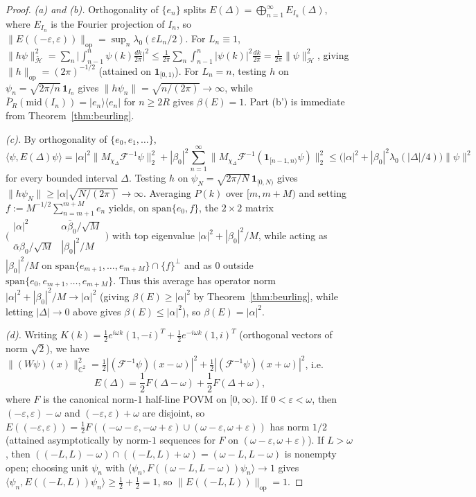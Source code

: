 \documentclass[11pt,a4paper]{article}
\theoremstyle{definition}
\theoremstyle{remark}
\newcommand{\HH}{\mathcal{H}}
\newcommand{\tH}{\widetilde{\mathcal{H}}}
\newcommand{\CC}{\mathbb{C}}
\newcommand{\op}{\mathrm{op}}
\newcommand{\one}{\mathbf{1}}
\newcommand{\ket}[1]{|#1\rangle}
\newcommand{\bra}[1]{\langle #1|}
\newcommand{\ip}[2]{\langle #1, #2 \rangle}
\newcommand{\norm}[1]{\|#1\|}
\begin{document}
\begin{proof}
\emph{(a) and (b).} Orthogonality of $\{e_n\}$ splits $E(\Delta)=\bigoplus_{n=1}^\infty E_{I_n}(\Delta)$, where $E_{I_n}$ is the Fourier projection of $I_n$, so $\norm{E((-\varepsilon,\varepsilon))}_{\op}=\sup_n\lambda_0(\varepsilon L_n/2)$. For $L_n\equiv 1$, $\norm{h\psi}_{\tH}^2 = \sum_n\bigl|\int_{n-1}^n\psi(k)\frac{dk}{2\pi}\bigr|^2 \le \frac{1}{2\pi}\sum_n\int_{n-1}^n|\psi(k)|^2\frac{dk}{2\pi} = \frac{1}{2\pi}\norm{\psi}_\HH^2$, giving $\norm{h}_{\op}=(2\pi)^{-1/2}$ (attained on $\one_{[0,1)}$). For $L_n=n$, testing $h$ on $\psi_n=\sqrt{2\pi/n}\,\one_{I_n}$ gives $\norm{h\psi_n}=\sqrt{n/(2\pi)}\to\infty$, while $\overline{P}_R(\mathrm{mid}(I_n))=\ket{e_n}\bra{e_n}$ for $n\ge 2R$ gives $\beta(E)=1$. Part (b') is immediate from Theorem~\ref{thm:beurling}.

\emph{(c).} By orthogonality of $\{e_0,e_1,\dots\}$,
\[
\ip{\psi}{E(\Delta)\psi} = |\alpha|^2\norm{M_{\chi_\Delta}\mathcal{F}^{-1}\psi}_2^2 + |\beta_0|^2\sum_{n=1}^\infty\norm{M_{\chi_\Delta}\mathcal{F}^{-1}(\one_{[n-1,n)}\psi)}_2^2 \le \bigl(|\alpha|^2+|\beta_0|^2\lambda_0(|\Delta|/4)\bigr)\norm{\psi}^2
\]
for every bounded interval $\Delta$. Testing $h$ on $\psi_N=\sqrt{2\pi/N}\,\one_{[0,N)}$ gives $\norm{h\psi_N}\ge |\alpha|\sqrt{N/(2\pi)}\to\infty$. Averaging $P(k)$ over $[m, m+M)$ and setting $f := M^{-1/2}\sum_{n=m+1}^{m+M} e_n$ yields, on $\mathrm{span}\{e_0, f\}$, the $2\times 2$ matrix $\bigl(\begin{smallmatrix}|\alpha|^2 & \alpha\bar\beta_0/\sqrt{M}\\ \bar\alpha\beta_0/\sqrt{M} & |\beta_0|^2/M\end{smallmatrix}\bigr)$ with top eigenvalue $|\alpha|^2+|\beta_0|^2/M$, while acting as $|\beta_0|^2/M$ on $\mathrm{span}\{e_{m+1},\dots,e_{m+M}\}\cap\{f\}^\perp$ and as $0$ outside $\mathrm{span}\{e_0,e_{m+1},\dots,e_{m+M}\}$. Thus this average has operator norm $|\alpha|^2+|\beta_0|^2/M\to|\alpha|^2$ (giving $\beta(E)\ge|\alpha|^2$ by Theorem~\ref{thm:beurling}, while letting $|\Delta|\to 0$ above gives $\beta(E)\le|\alpha|^2$), so $\beta(E)=|\alpha|^2$.

\emph{(d).} Writing $K(k)=\frac{1}{2}e^{i\omega k}(1,-i)^T + \frac{1}{2}e^{-i\omega k}(1,i)^T$ (orthogonal vectors of norm $\sqrt{2}$), we have $\norm{(W\psi)(x)}_{\CC^2}^2 = \frac{1}{2}|(\mathcal{F}^{-1}\psi)(x-\omega)|^2 + \frac{1}{2}|(\mathcal{F}^{-1}\psi)(x+\omega)|^2$, i.e.
\[
E(\Delta) = \frac{1}{2}F(\Delta-\omega) + \frac{1}{2}F(\Delta+\omega),
\]
where $F$ is the canonical norm-$1$ half-line POVM on $[0,\infty)$. If $0<\varepsilon<\omega$, then $(-\varepsilon,\varepsilon)-\omega$ and $(-\varepsilon,\varepsilon)+\omega$ are disjoint, so $E((-\varepsilon,\varepsilon))=\frac{1}{2}F((-\omega-\varepsilon,-\omega+\varepsilon)\cup(\omega-\varepsilon,\omega+\varepsilon))$ has norm $1/2$ (attained asymptotically by norm-$1$ sequences for $F$ on $(\omega-\varepsilon,\omega+\varepsilon)$). If $L>\omega$, then $((-L,L)-\omega)\cap((-L,L)+\omega)=(\omega-L,L-\omega)$ is nonempty open; choosing unit $\psi_n$ with $\ip{\psi_n}{F((\omega-L,L-\omega))\psi_n}\to 1$ gives $\ip{\psi_n}{E((-L,L))\psi_n}\ge \frac{1}{2}+\frac{1}{2}=1$, so $\norm{E((-L,L))}_{\op}=1$.
\end{proof}
\end{document}
